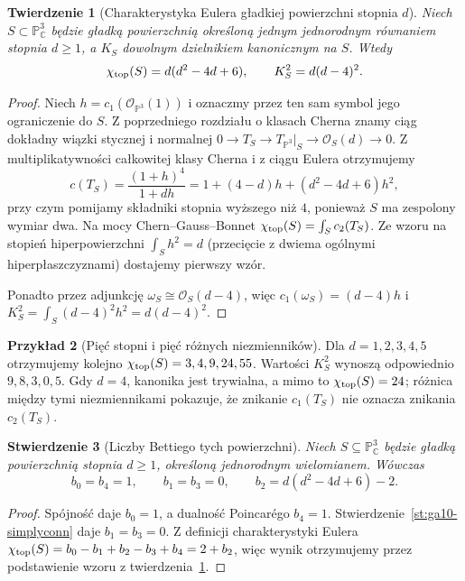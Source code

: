 \documentclass[11pt,a4paper,openany]{report}
\numberwithin{equation}{section}
\theoremstyle{plain}
\newtheorem{twierdzenie}{Twierdzenie}[section]
\newtheorem{stwierdzenie}[twierdzenie]{Stwierdzenie}
\theoremstyle{definition}
\newtheorem{przyklad}[twierdzenie]{Przykład}
\theoremstyle{remark}
\newcommand{\C}{\mathbb C}
\newcommand{\PP}{\mathbb P}
\begin{document}
\begin{twierdzenie}[Charakterystyka Eulera gładkiej powierzchni stopnia $d$]
\label{tw:ga10-surface-euler}
Niech $S\subset\PP^3_\C$ będzie gładką powierzchnią
określoną jednym jednorodnym równaniem stopnia $d\ge1$,
a $K_S$ dowolnym dzielnikiem kanonicznym na $S$.
Wtedy
\[
 \chi_{\rm top}(S)=d(d^2-4d+6),\qquad
 K_S^2=d(d-4)^2.
\]
\end{twierdzenie}
\begin{proof}
Niech $h=c_1(\mathcal O_{\PP^3}(1))$ i oznaczmy przez ten sam
symbol jego ograniczenie do $S$.
Z poprzedniego rozdziału o klasach Cherna znamy ciąg dokładny
wiązki stycznej i normalnej
$0\to T_S\to T_{\PP^3}|_S\to\mathcal O_S(d)\to0$.
Z multiplikatywności całkowitej klasy Cherna i z ciągu Eulera
otrzymujemy
\[
 c(T_S)=\frac{(1+h)^4}{1+dh}
 =1+(4-d)h+(d^2-4d+6)h^2,
\]
przy czym pomijamy składniki stopnia wyższego niż $4$,
ponieważ $S$ ma zespolony wymiar dwa.
Na mocy Chern--Gauss--Bonnet
$\chi_{\rm top}(S)=\int_S c_2(T_S)$.
Ze wzoru na stopień hiperpowierzchni
$\int_S h^2=d$ (przecięcie z dwiema ogólnymi
hiperpłaszczyznami) dostajemy pierwszy wzór.

Ponadto przez adjunkcję
$\omega_S\cong\mathcal O_S(d-4)$, więc
$c_1(\omega_S)=(d-4)h$ i
$K_S^2=\int_S (d-4)^2h^2=d(d-4)^2$.
\end{proof}

\begin{przyklad}[Pięć stopni i pięć różnych niezmienników]
Dla $d=1,2,3,4,5$ otrzymujemy kolejno
$\chi_{\rm top}(S)=3,4,9,24,55$.
Wartości $K_S^2$ wynoszą odpowiednio $9,8,3,0,5$.
Gdy $d=4$, kanonika jest trywialna, a mimo to
$\chi_{\rm top}(S)=24$; różnica między tymi niezmiennikami
pokazuje, że znikanie $c_1(T_S)$ nie oznacza znikania
$c_2(T_S)$.
\end{przyklad}

\begin{stwierdzenie}[Liczby Bettiego tych powierzchni]
\label{st:ga10-betti}
Niech $S\subseteq\PP^3_\C$ będzie gładką powierzchnią
stopnia $d\ge1$, określoną jednorodnym wielomianem.
Wówczas
\[
 b_0=b_4=1,\qquad b_1=b_3=0,\qquad
 b_2=d(d^2-4d+6)-2.
\]
\end{stwierdzenie}
\begin{proof}
Spójność daje $b_0=1$, a dualność Poincarégo $b_4=1$.
Stwierdzenie~\ref{st:ga10-simplyconn} daje $b_1=b_3=0$.
Z definicji charakterystyki Eulera
$\chi_{\rm top}(S)=b_0-b_1+b_2-b_3+b_4=2+b_2$,
więc wynik otrzymujemy przez podstawienie
wzoru z twierdzenia~\ref{tw:ga10-surface-euler}.
\end{proof}
\end{document}
